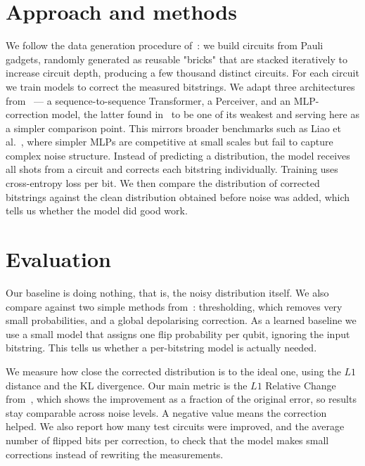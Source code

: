 \documentclass[english]{ucuproposal}
\begin{document}
\section{Approach and methods}
We follow the data generation procedure of~\cite{placidi2026qem}: we build circuits from Pauli gadgets, randomly generated as reusable "bricks" that are stacked iteratively to increase circuit depth, producing a few thousand distinct circuits. For each circuit we train models to correct the measured bitstrings. We adapt three architectures from~\cite{placidi2026qem} — a sequence-to-sequence Transformer, a Perceiver, and an MLP-correction model, the latter found in~\cite{placidi2026qem} to be one of its weakest and serving here as a simpler comparison point. This mirrors broader benchmarks such as Liao et al.~\cite{liao2024mlqem}, where simpler MLPs are competitive at small scales but fail to capture complex noise structure. Instead of predicting a distribution, the model receives all shots from a circuit and corrects each bitstring individually. Training uses cross-entropy loss per bit. We then compare the distribution of corrected bitstrings against the clean distribution obtained before noise was added, which tells us whether the model did good work.

\section{Evaluation}
Our baseline is doing nothing, that is, the noisy distribution itself. We also compare
against two simple methods from~\cite{placidi2026qem}: thresholding, which removes very
small probabilities, and a global depolarising correction. As a learned baseline we use
a small model that assigns one flip probability per qubit, ignoring the input bitstring.
This tells us whether a per-bitstring model is actually needed.

We measure how close the corrected distribution is to the ideal one, using the $L1$
distance and the KL divergence. Our main metric is the $L1$ Relative Change
from~\cite{placidi2026qem}, which shows the improvement as a fraction of the original
error, so results stay comparable across noise levels. A negative value means the
correction helped. We also report how many test circuits were improved, and the average
number of flipped bits per correction, to check that the model makes small corrections
instead of rewriting the measurements.
\end{document}
